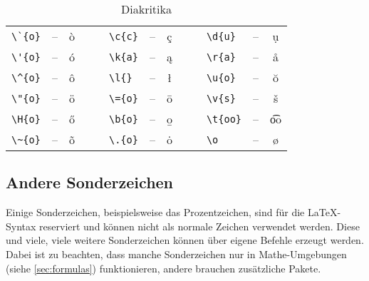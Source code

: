 \begin{table}[H]
	\center
	\begin{tabular}{lccclccclcc}
		\toprule
			\verb|\`{o}| & -- & \`{o} & $\quad$ & \verb|\c{c}| & -- & \c{c} & $\quad$ & \verb|\d{u}| & -- & \d{u} \\
			\verb|\'{o}| & -- & \'{o} & & \verb|\k{a}| & -- & \k{a} & & \verb|\r{a}| & -- & \r{a} \\
			\verb|\^{o}| & -- & \^{o} & & \verb|\l{}| & -- & \l{} & & \verb|\u{o}| & -- & \u{o} \\
			\verb|\"{o}| & -- & \"{o} & & \verb|\={o}| & -- & \={o} & & \verb|\v{s}| & -- & \v{s} \\
			\verb|\H{o}| & -- & \H{o} & & \verb|\b{o}| & -- & \b{o} & & \verb|\t{oo}| & -- & \t{oo} \\
			\verb|\~{o}| & -- & \~{o} & & \verb|\.{o}| & -- & \.{o} & & \verb|\o| & -- & \o \\
		\bottomrule
	\end{tabular}
	\caption{Diakritika}
	\label{tbl:diacritics}
\end{table}

\subsection{Andere Sonderzeichen}
Einige Sonderzeichen, beispielsweise das Prozentzeichen, sind für die \LaTeX{}-Syntax reserviert und können nicht als normale Zeichen verwendet werden.
Diese und viele, viele weitere Sonderzeichen können über eigene Befehle erzeugt werden.
Dabei ist zu beachten, dass manche Sonderzeichen nur in Mathe-Umgebungen (siehe \cref{sec:formulas}) funktionieren, andere brauchen zusätzliche Pakete.

